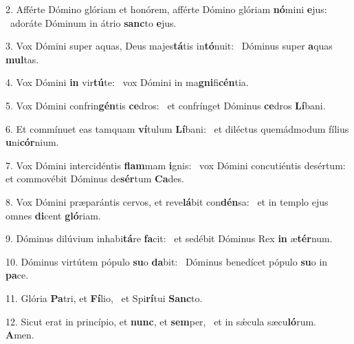 2. Afférte Dómino glóriam et honórem, afférte Dómino glóriam \textbf{nó}mini \textbf{e}jus: \ast\  adoráte Dóminum in átrio \textbf{sanc}to \textbf{e}jus.\

3. Vox Dómini super aquas, Deus majes\textbf{tá}tis in\textbf{tó}nuit: \ast\  Dóminus super \textbf{a}quas \textbf{mul}tas.\

4. Vox Dómini \textbf{in} vir\textbf{tú}te: \ast\  vox Dómini in ma\textbf{gni}fi\textbf{cén}tia.\

5. Vox Dómini confrin\textbf{gén}tis \textbf{ce}dros: \ast\  et confrínget Dóminus \textbf{ce}dros \textbf{Lí}bani.\

6. Et commínuet eas tamquam \textbf{ví}tulum \textbf{Lí}bani: \ast\  et diléctus quemádmodum fílius \textbf{u}ni\textbf{cór}nium.\

7. Vox Dómini intercidéntis \textbf{flam}mam \textbf{i}gnis: \ast\  vox Dómini concutiéntis desértum: et commovébit Dóminus de\textbf{sér}tum \textbf{Ca}des.\

8. Vox Dómini præparántis cervos, et reve\textbf{lá}bit con\textbf{dén}sa: \ast\  et in templo ejus omnes \textbf{di}cent \textbf{gló}riam.\

9. Dóminus dilúvium inhabi\textbf{tá}re \textbf{fa}cit: \ast\  et sedébit Dóminus Rex \textbf{in} æ\textbf{tér}num.\

10. Dóminus virtútem pópulo \textbf{su}o \textbf{da}bit: \ast\  Dóminus benedícet pópulo \textbf{su}o in \textbf{pa}ce.\

11. Glória \textbf{Pa}tri, et \textbf{Fí}lio, \ast\  et Spi\textbf{rí}tui \textbf{Sanc}to.\

12. Sicut erat in princípio, et \textbf{nunc}, et \textbf{sem}per, \ast\  et in sǽcula sæcu\textbf{ló}rum. \textbf{A}men.\

